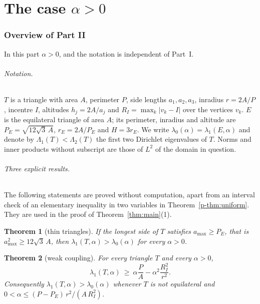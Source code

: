 \documentclass[11pt]{article}
\newtheorem{theorem}{Theorem}[section]
\theoremstyle{remark}
\begin{document}
\part{The case \texorpdfstring{$\alpha>0$}{alpha > 0}}

\section{Overview of Part II}\label{p-sec:overview}

In this part $\alpha>0$, and the notation is independent of Part~I.

\paragraph{Notation.} $T$ is a triangle with area $A$, perimeter $P$, side lengths
$a_1,a_2,a_3$, inradius $r=2A/P$, incentre $I$, altitudes $h_j=2A/a_j$ and
$R_I=\max_k|v_k-I|$ over the vertices $v_k$. $E$ is the equilateral triangle of area $A$; its
perimeter, inradius and altitude are $P_E=\sqrt{12\sqrt3\,A}$, $r_E=2A/P_E$ and $H=3r_E$.
We write $\lambda_0(\alpha)=\lambda_1(E,\alpha)$ and denote by
$\Lambda_1(T)<\Lambda_2(T)$ the first two Dirichlet eigenvalues of $T$. Norms and inner products
without subscript are those of $L^2$ of the domain in question.

\paragraph{Three explicit results.} The following statements are proved without computation, apart
from an interval check of an elementary inequality in two variables in Theorem~\ref{p-thm:uniform}.
They are used in the proof of Theorem~\ref{thm:main}(1).

\begin{theorem}[thin triangles]\label{p-thm:thin}
If the longest side of $T$ satisfies $a_{\max}\ge P_E$, that is $a_{\max}^2\ge12\sqrt3\,A$, then
$\lambda_1(T,\alpha)>\lambda_0(\alpha)$ for every $\alpha>0$.
\end{theorem}

\begin{theorem}[weak coupling]\label{p-thm:small}
For every triangle $T$ and every $\alpha>0$,
\begin{equation}\label{p-eq:small}
  \lambda_1(T,\alpha)\ \ge\ \alpha\frac PA-\alpha^2\frac{R_I^2}{r^2}.
\end{equation}
Consequently $\lambda_1(T,\alpha)>\lambda_0(\alpha)$ whenever $T$ is not equilateral and
$0<\alpha\le (P-P_E)\,r^2/(A\,R_I^2)$.
\end{theorem}
\end{document}

